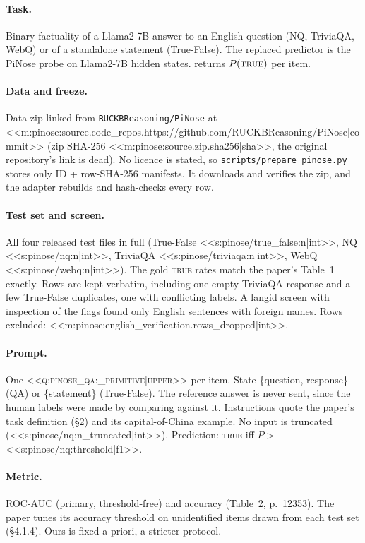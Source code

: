 \paragraph{Task.} Binary factuality of a Llama2-7B answer to an English question (NQ, TriviaQA, WebQ) or of a standalone
statement (True-False). The replaced predictor is the PiNose probe on Llama2-7B hidden states. \jev{} returns
$P(\textsc{true})$ per item.

\paragraph{Data and freeze.} Data zip linked from \texttt{RUCKBReasoning/PiNose} at
<<m:pinose:source.code_repos.https://github.com/RUCKBReasoning/PiNose|commit>> (zip SHA-256
<<m:pinose:source.zip.sha256|sha>>, the original repository's link is dead). No licence is stated, so
\texttt{scripts/\allowbreak{}prepare\_pinose.py} stores only ID + row-SHA-256 manifests. It downloads and verifies the zip,
and the adapter rebuilds and hash-checks every row.

\paragraph{Test set and screen.} All four released test files in full (True-False <<s:pinose/true_false:n|int>>, NQ
<<s:pinose/nq:n|int>>, TriviaQA <<s:pinose/triviaqa:n|int>>, WebQ <<s:pinose/webq:n|int>>). The gold
\textsc{true} rates match the paper's Table~1 exactly. Rows are kept verbatim, including one empty TriviaQA response
and a few True-False duplicates, one with conflicting labels. A langid screen with
inspection of the flags found only English sentences with foreign names. Rows excluded:
<<m:pinose:english_verification.rows_dropped|int>>.

\paragraph{Prompt.} One \textsc{<<q:pinose_qa:_primitive|upper>>} per item. State \{question, response\} (QA) or
\{statement\} (True-False). The reference answer is never sent, since the human labels were made by comparing
against it. Instructions quote the paper's task definition (\S2) and its capital-of-China example. No input is
truncated (<<s:pinose/nq:n_truncated|int>>). Prediction: \textsc{true} iff $P>$ <<s:pinose/nq:threshold|f1>>.

\paragraph{Metric.} ROC-AUC (primary, threshold-free) and accuracy (Table~2, p.~12353). The paper tunes its accuracy
threshold on unidentified items drawn from each test set (\S4.1.4). Ours is fixed a priori, a stricter protocol.

